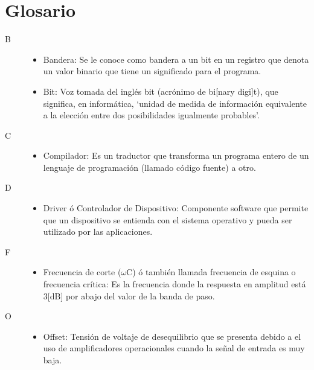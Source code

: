 \documentclass[letterpaper,12pt,oneside]{book}
\begin{document}
	\chapter{Glosario}
	\begin{description}
		\item[\LARGE B]
		\hfill
		\begin{itemize}
			\item Bandera: Se le conoce como bandera a un bit en un registro que denota un valor binario que tiene un significado para el programa.

			\item Bit: Voz tomada del inglés bit (acrónimo de bi[nary digi]t), que significa, en informática, ‘unidad de medida de información equivalente a la elección entre dos posibilidades igualmente probables’.%
		\end{itemize}

		\item[\LARGE C]
		\hfill
		\begin{itemize}
			\item Compilador: Es un traductor que transforma un programa entero de un lenguaje de programación (llamado código fuente) a otro. %
		\end{itemize}

		\item[\LARGE D]
		\hfill
		\begin{itemize}
			\item Driver ó Controlador de Dispositivo: Componente software que permite que un dispositivo se entienda con el sistema operativo y pueda ser utilizado por las aplicaciones.
		\end{itemize}

		\item[\LARGE F]
		\hfill
		\begin{itemize}
			\item Frecuencia de corte ($\omega$C) ó también llamada frecuencia de esquina o frecuencia crítica: Es la frecuencia donde la respuesta en amplitud está 3[dB] por abajo del valor de la banda de paso.
		\end{itemize}

		\item[\LARGE O]
		\hfill
		\begin{itemize}
			\item Offset: Tensión de voltaje de desequilibrio que se presenta debido a el uso de amplificadores operacionales cuando la señal de entrada es muy baja.\cite{areny2005sensores}
		\end{itemize}


\end{description}
\end{document}
